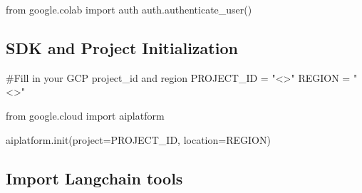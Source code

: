\documentclass[
  letterpaper,
  DIV=11,
  numbers=noendperiod]{scrreprt}
\newenvironment{Shaded}{\begin{snugshade}}{\end{snugshade}}
\newcommand{\CommentTok}[1]{\textcolor[rgb]{0.37,0.37,0.37}{#1}}
\newcommand{\ImportTok}[1]{\textcolor[rgb]{0.00,0.46,0.62}{#1}}
\newcommand{\NormalTok}[1]{\textcolor[rgb]{0.00,0.23,0.31}{#1}}
\newcommand{\OperatorTok}[1]{\textcolor[rgb]{0.37,0.37,0.37}{#1}}
\newcommand{\StringTok}[1]{\textcolor[rgb]{0.13,0.47,0.30}{#1}}
\begin{document}
\begin{Shaded}
\begin{Highlighting}[]
\ImportTok{from}\NormalTok{ google.colab }\ImportTok{import}\NormalTok{ auth}
\NormalTok{auth.authenticate\_user()}
\end{Highlighting}
\end{Shaded}

\hypertarget{sdk-and-project-initialization}{%
\subsection{SDK and Project
Initialization}\label{sdk-and-project-initialization}}

\begin{Shaded}
\begin{Highlighting}[]
\CommentTok{\#Fill in your GCP project\_id and region}
\NormalTok{PROJECT\_ID }\OperatorTok{=} \StringTok{"\textless{}\textgreater{}"}
\NormalTok{REGION }\OperatorTok{=} \StringTok{"\textless{}\textgreater{}"}

\ImportTok{from}\NormalTok{ google.cloud }\ImportTok{import}\NormalTok{ aiplatform}

\NormalTok{aiplatform.init(project}\OperatorTok{=}\NormalTok{PROJECT\_ID, location}\OperatorTok{=}\NormalTok{REGION)}
\end{Highlighting}
\end{Shaded}

\hypertarget{import-langchain-tools}{%
\subsection{Import Langchain tools}\label{import-langchain-tools}}
\end{document}
